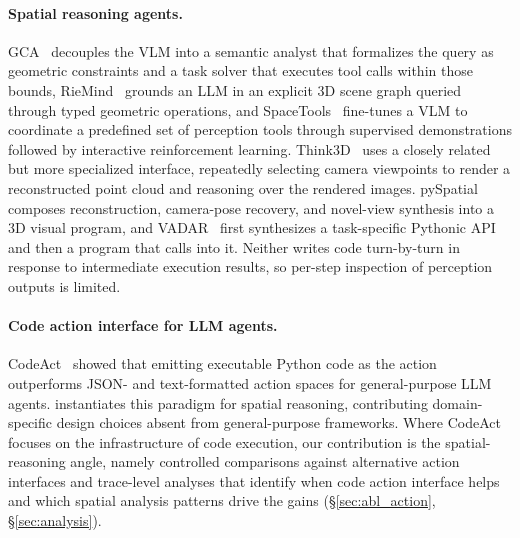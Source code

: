 \paragraph{Spatial reasoning agents.}
GCA~\citep{chen2025geometrically} decouples the VLM into a semantic analyst that formalizes the query as geometric constraints and a task solver that executes tool calls within those bounds, RieMind~\citep{ropero2026riemind} grounds an LLM in an explicit 3D scene graph queried through typed geometric operations, and SpaceTools~\citep{chen2025spacetools} fine-tunes a VLM to coordinate a predefined set of perception tools through supervised demonstrations followed by interactive reinforcement learning.
Think3D~\citep{zhang2026think3d} uses a closely related but more specialized interface, repeatedly selecting camera viewpoints to render a reconstructed point cloud and reasoning over the rendered images.
pySpatial~\citep{luo2026pyspatial} composes reconstruction, camera-pose recovery, and novel-view synthesis into a 3D visual program, and VADAR~\citep{marsili2025visual} first synthesizes a task-specific Pythonic API and then a program that calls into it.
Neither writes code turn-by-turn in response to intermediate execution results, so per-step inspection of perception outputs is limited.

\paragraph{Code action interface for LLM agents.}
CodeAct~\citep{wang2024executable} showed that emitting executable Python code as the action outperforms JSON- and text-formatted action spaces for general-purpose LLM agents.
\ours{} instantiates this paradigm for spatial reasoning, contributing domain-specific design choices absent from general-purpose frameworks.
Where CodeAct focuses on the infrastructure of code execution, our contribution is the spatial-reasoning angle, namely controlled comparisons against alternative action interfaces and trace-level analyses that identify when code action interface helps and which spatial analysis patterns drive the gains (\S\ref{sec:abl_action}, \S\ref{sec:analysis}).

